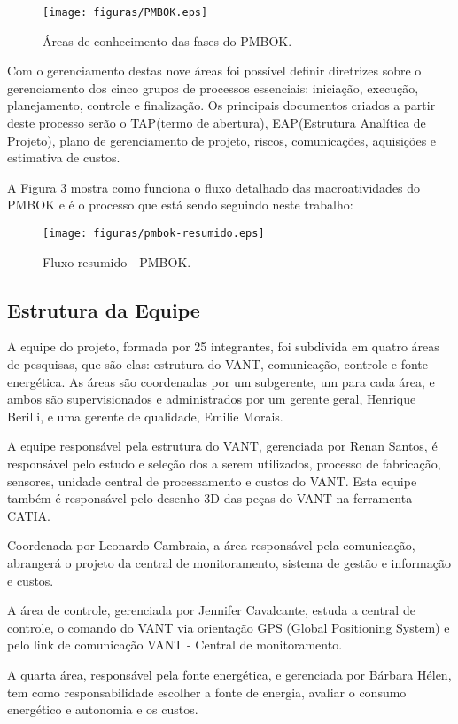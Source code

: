  \begin{figure}[ht]
	\centering
		\texttt{[image: figuras/PMBOK.eps]}
	\caption{Áreas de conhecimento das fases do PMBOK.}
\end{figure}

Com o gerenciamento destas nove áreas foi possível definir diretrizes sobre o gerenciamento dos cinco grupos de processos essenciais: iniciação, execução, planejamento, controle e finalização. Os principais documentos criados a partir deste processo serão o TAP(termo de abertura), EAP(Estrutura Analítica de Projeto), plano de gerenciamento de projeto, riscos, comunicações, aquisições e estimativa de custos.

A Figura 3 mostra como funciona o fluxo detalhado das macroatividades do PMBOK e é o processo que está sendo seguindo neste trabalho:

\begin{figure}[ht]
	\centering
		\texttt{[image: figuras/pmbok-resumido.eps]}
	\caption{Fluxo resumido - PMBOK.}
\end{figure}

\subsection{Estrutura da Equipe}
A equipe do projeto, formada por 25 integrantes, foi subdivida em quatro áreas de pesquisas, que são elas: estrutura do VANT, comunicação, controle e fonte energética. As áreas são coordenadas por um subgerente, um para cada área, e ambos são supervisionados e administrados por um gerente geral, Henrique Berilli, e uma gerente de qualidade, Emilie Morais.

A equipe responsável pela estrutura do VANT, gerenciada por Renan Santos, é responsável pelo estudo e seleção dos a serem utilizados, processo de fabricação, sensores, unidade central de processamento e custos do VANT. Esta equipe também é responsável pelo desenho 3D das peças do VANT na ferramenta CATIA.  
	
Coordenada por Leonardo Cambraia, a área responsável pela comunicação, abrangerá o projeto da central de monitoramento, sistema de gestão e informação e custos.
	
A área de controle, gerenciada por Jennifer Cavalcante, estuda a central de controle, o comando do VANT via orientação GPS (Global Positioning System) e pelo link de comunicação VANT - Central de monitoramento.
	
A quarta área, responsável pela fonte energética, e gerenciada por Bárbara Hélen, tem como responsabilidade escolher a fonte de energia, avaliar o consumo energético e autonomia e os custos.
	
